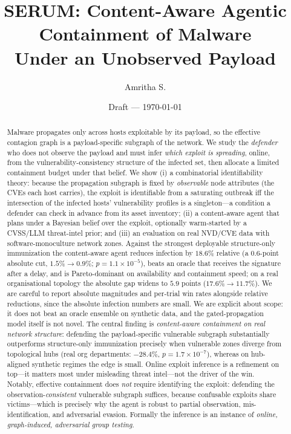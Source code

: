 \documentclass[11pt]{article}
\title{\textbf{SERUM}: Content-Aware Agentic Containment of Malware\\
Under an Unobserved Payload}
\author{Amritha S.}
\date{Draft --- \today}
\begin{document}
\maketitle

\begin{abstract}
Malware propagates only across hosts exploitable by its payload, so the
effective contagion graph is a payload-specific subgraph of the network. We
study the \emph{defender} who does not observe the payload and must infer
\emph{which exploit is spreading}, online, from the vulnerability-consistency
structure of the infected set, then allocate a limited containment budget under
that belief. We show (i) a combinatorial identifiability theory: because the
propagation subgraph is fixed by \emph{observable} node attributes (the CVEs each
host carries), the exploit is identifiable from a saturating outbreak iff the
intersection of the infected hosts' vulnerability profiles is a singleton---a
condition a defender can check in advance from its asset inventory; (ii) a
content-aware agent that plans under a Bayesian belief over the exploit,
optionally warm-started by a CVSS/LLM threat-intel prior; and (iii) an evaluation
on real NVD/CVE data with software-monoculture network zones. Against the
strongest deployable structure-only immunization the content-aware agent reduces
infection by $18.6\%$ relative (a $0.6$-point absolute cut, $1.5\%\!\to\!0.9\%$;
$p=1.1\times10^{-5}$), beats an oracle that receives the signature after a delay,
and is Pareto-dominant on availability and containment speed; on a real
organisational topology the absolute gap widens to $5.9$ points
($17.6\%\!\to\!11.7\%$). We are careful to report absolute magnitudes and
per-trial win rates alongside relative reductions, since the absolute infection
numbers are small. We are explicit about scope: it does not beat an oracle ensemble on
synthetic data, and the gated-propagation model itself is not novel. The central
finding is \emph{content-aware containment on real network structure}: defending
the payload-specific vulnerable subgraph substantially outperforms structure-only
immunization precisely when vulnerable zones diverge from topological hubs (real
org departments: $-28.4\%$, $p{=}1.7\times10^{-7}$), whereas on hub-aligned
synthetic regimes the edge is small. Online exploit inference is a refinement on
top---it matters most under misleading threat intel---not the driver of the win.
Notably, effective containment does \emph{not} require identifying the exploit:
defending the observation-\emph{consistent} vulnerable subgraph suffices, because
confusable exploits share victims---which is precisely why the agent is robust to
partial observation, mis-identification, and adversarial evasion. Formally the
inference is an instance of \emph{online, graph-induced, adversarial group
testing}.
\end{abstract}
\end{document}
